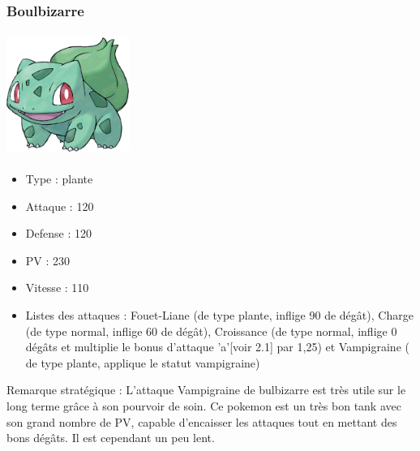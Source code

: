 		\subsubsection{Boulbizarre}
            \begin{center}
				\includegraphics[width=4cm,height=4cm]{images/boulbizarre}
			\end{center}
			\begin{itemize}
				\item Type : plante
				\item Attaque : 120
				\item Defense : 120
				\item PV : 230
				\item Vitesse : 110
				\item Listes des attaques : Fouet-Liane (de type plante, inflige 90 de dégât), Charge (de type normal, inflige 60 de dégât), Croissance (de type normal, inflige 0 dégâts et multiplie le bonus d'attaque 'a'[voir 2.1] par 1,25) et Vampigraine ( de type plante, applique le statut vampigraine)
			\end{itemize}
			Remarque stratégique : L'attaque Vampigraine de bulbizarre est très utile sur le long terme grâce à son pourvoir de soin. Ce pokemon est un très bon tank avec son grand nombre de PV, capable d'encaisser les attaques tout en mettant des bons dégâts. Il est cependant un peu lent.
